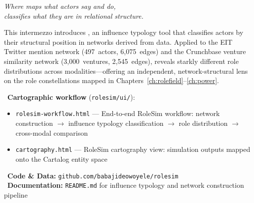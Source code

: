 \documentclass[../main.tex]{subfiles}
\begin{document}

\begin{center}
\end{center}

\vspace{1.5cm}

\begin{center}
\textit{\large Where \RoleBox{} maps what actors \emph{say} and \emph{do},\\[0.3em]
\RoleSim{} classifies what they \emph{are} in relational structure.}
\end{center}

\vspace{1.5cm}

\begin{chapteroverview}
This intermezzo introduces \RoleSim, an influence typology tool that classifies
actors by their structural position in networks derived from \RoleBox{} data.
Applied to the EIT Twitter mention network (497~actors, 6,075~edges) and the
Crunchbase venture similarity network (3,000~ventures, 2,545~edges),
\RoleSim{} reveals starkly different role distributions across modalities---offering
an independent, network-structural lens on the role constellations mapped in
Chapters~\ref{ch:rolefield}--\ref{ch:power}.
\end{chapteroverview}

\begin{replicationbox}
\faLaptopCode\ \textbf{Cartographic workflow} (\texttt{rolesim/ui/}):
\begin{itemize}[leftmargin=*, itemsep=0.1em]
    \item \texttt{rolesim-workflow.html} --- End-to-end RoleSim workflow: network construction $\rightarrow$ influence typology classification $\rightarrow$ role distribution $\rightarrow$ cross-modal comparison
    \item \texttt{cartography.html} --- RoleSim cartography view: simulation outputs mapped onto the Cartalog entity space
\end{itemize}
\faGithub\ \textbf{Code \& Data:} \texttt{github.com/babajideowoyele/rolesim}\\
\faBook\ \textbf{Documentation:} \texttt{README.md} for influence typology and network construction pipeline
\end{replicationbox}
\end{document}
